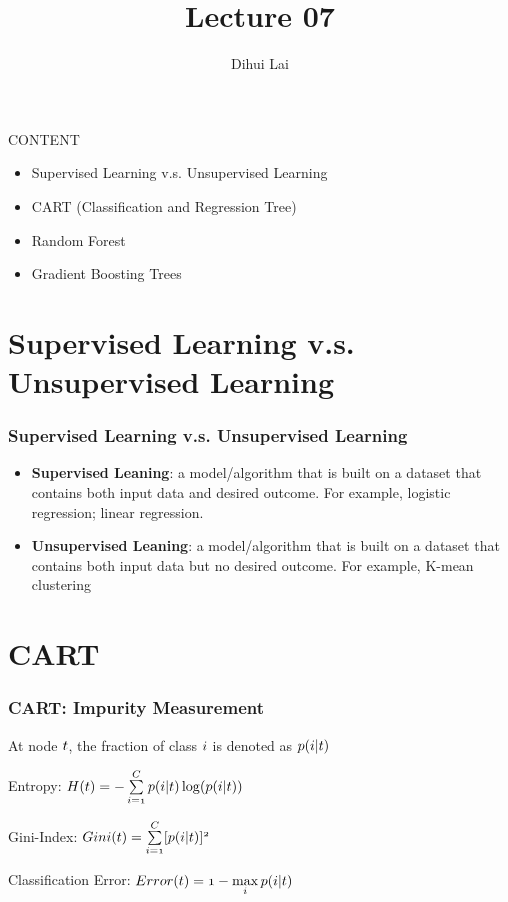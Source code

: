 \documentclass[notheorems, aspectratio=54]{beamer}
\title{Lecture 07}
\author{Dihui Lai}
\institute[WUSTL]{dlai@wustl.edu}
\begin{document}
\begin{frame}
    \titlepage
\end{frame}


\begin{frame}
CONTENT
\begin{itemize}
\item Supervised Learning v.s. Unsupervised Learning
\item CART (Classification and Regression Tree)
\item Random Forest
\item Gradient Boosting Trees
\end{itemize} 
\end{frame}


\section{Supervised Learning v.s. Unsupervised Learning}

\begin{frame}
\frametitle{Supervised Learning v.s. Unsupervised Learning}
\begin{itemize}
\item \textbf{Supervised Leaning}: a model/algorithm that is built on a dataset that contains both input data and desired outcome. For example, logistic regression; linear regression.
\item \textbf{Unsupervised Leaning}: a model/algorithm that is built on a dataset that contains both input data but no desired outcome. For example, K-mean clustering
\end{itemize}
\end{frame}

\section{CART}
\begin{frame}
    \frametitle{CART: Impurity Measurement}
    At node $\mathnormal{t}$, the fraction of class $\mathnormal{i}$ is denoted as $\mathnormal{p(i|t)}$
    
    Entropy: $\mathnormal{H(t)=-\sum\limits_{i=1}^{C}p(i|t)\log(p(i|t))}$
    
    Gini-Index: $\mathnormal{Gini(t)=\sum\limits_{i=1}^{C}[p(i|t)]^2}$
    
    Classification Error: $\mathnormal{Error(t)=1-\max\limits_{i}p(i| t)}$
\end{frame}
\end{document}
